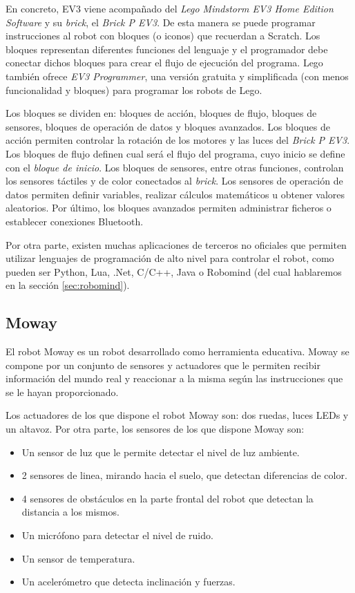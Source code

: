 {{En concreto, EV3 viene acompañado del \emph{Lego Mindstorm EV3 Home Edition Software} y su \emph{brick}, el \emph{Brick P EV3}. De esta manera se puede programar instrucciones al robot con bloques (o iconos) que recuerdan a Scratch. Los bloques representan diferentes funciones del lenguaje y el programador debe conectar dichos bloques para crear el flujo de ejecución del programa. Lego también ofrece \emph{EV3 Programmer}, una versión gratuita y simplificada (con menos funcionalidad y bloques) para programar los robots de Lego.

Los bloques se dividen en: bloques de acción, bloques de flujo, bloques de sensores, bloques de operación de datos y bloques avanzados. 
Los bloques de acción permiten controlar la rotación de los motores y las luces del \emph{Brick P EV3}. Los bloques de flujo definen cual será el flujo del programa, cuyo inicio se define con el \emph{bloque de inicio}. Los bloques de sensores, entre otras funciones, controlan los sensores táctiles y de color conectados al \emph{brick}. Los sensores de operación de datos permiten definir variables, realizar cálculos matemáticos u obtener valores aleatorios. Por último, los bloques avanzados permiten administrar ficheros o establecer conexiones Bluetooth.

Por otra parte, existen muchas aplicaciones de terceros no oficiales que permiten utilizar lenguajes de programación de alto nivel para controlar el robot, como pueden ser Python, Lua, .Net, C/C++, Java o Robomind (del cual hablaremos en la sección \ref{sec:robomind}).


\subsection{Moway}
\label{sec:moway}


El robot Moway\cite{moway} es un robot desarrollado como herramienta educativa. Moway se compone por un conjunto de sensores y actuadores que le permiten recibir información del mundo real y reaccionar a la misma según las instrucciones que se le hayan proporcionado.

Los actuadores de los que dispone el robot Moway son: dos ruedas, luces LEDs y un altavoz. Por otra parte, los sensores de los que dispone Moway son:
 
\begin{itemize}
	\item Un sensor de luz que le permite detectar el nivel de luz ambiente. 
	\item 2 sensores de linea, mirando hacia el suelo, que detectan diferencias de color.
	\item 4 sensores de obstáculos en la parte frontal del robot que detectan la distancia a los mismos.
	\item Un micrófono para detectar el nivel de ruido.
	\item Un sensor de temperatura. 
	\item Un acelerómetro que detecta inclinación y fuerzas.
\end{itemize}

}}
